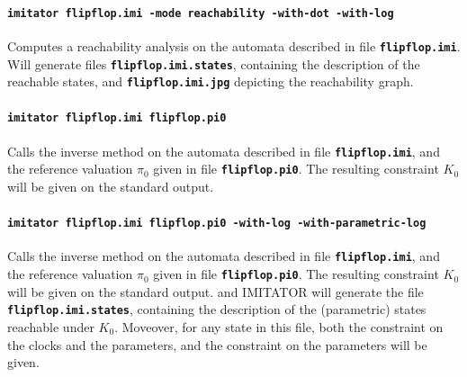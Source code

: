 \documentclass[a4paper,11pt]{report}
\newcommand{\imitator}{\textsf{IMITATOR}}
\newcommand{\imitatorExec}{\code{imitator}}
\newcommand{\code}[1]{\textbf{\texttt{#1}}}
\begin{document}
\paragraph{\code{\imitatorExec{} flipflop.imi -mode reachability -with-dot -with-log}}
Computes a reachability analysis on the automata described in file \code{flipflop.imi}.
Will generate files \code{flipflop.imi.states}, containing the description of the reachable states, and \code{flipflop.imi.jpg} depicting the reachability graph.


\paragraph{\code{\imitatorExec{} flipflop.imi flipflop.pi0}}
Calls the inverse method on the automata described in file \code{flipflop.imi}, and the reference valuation $\pi_0$ given in file \code{flipflop.pi0}.
The resulting constraint $K_0$ will be given on the standard output.




\paragraph{\code{\imitatorExec{} flipflop.imi flipflop.pi0 -with-log -with-parametric-log}}
Calls the inverse method on the automata described in file \code{flipflop.imi}, and the reference valuation $\pi_0$ given in file \code{flipflop.pi0}.
The resulting constraint $K_0$ will be given on the standard output.
and \imitator{} will generate the file \code{flipflop.imi.states}, containing the description of the (parametric) states reachable under $K_0$.
Moveover, for any state in this file, both the constraint on the clocks and the parameters, and the constraint on the parameters will be given.
\end{document}
